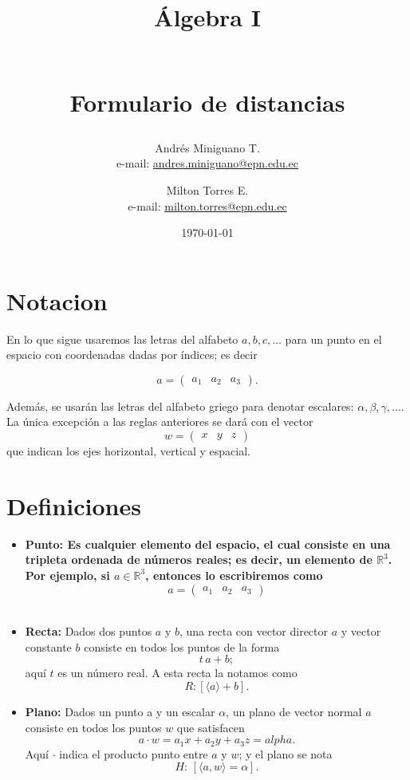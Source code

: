 \documentclass[11pt, a4paper]{article} %
\title{\begin{large}Álgebra  I\end{large}\\ Formulario de distancias}
\author{Andrés Miniguano T. \\ e-mail: \href{mailto:andres.miniguano@epn.edu.ec}{andres.miniguano@epn.edu.ec} 
   \and Milton Torres E. \\ e-mail: \href{mailto:milton.torres@epn.edu.ec}{milton.torres@epn.edu.ec} }
\date{\today}
\newcommand{\R}{\mathbb{R}}
\begin{document}
\maketitle


\section*{Notacion}En lo que sigue usaremos las letras del alfabeto \(a,b,c,\ldots\) para un punto en el espacio con coordenadas dadas por índices; es decir

\[ 
a=  \begin{pmatrix}  a_1 & a_2 & a_3 \end{pmatrix}.
\]

Además, se usarán las letras del alfabeto griego para denotar escalares: \(\alpha, \beta, \gamma, \ldots\). 
\noindent La única excepción a las reglas anteriores se dará con el vector
\[ 
	w=  \begin{pmatrix}  x & y & z\end{pmatrix}
\]
que indican los ejes horizontal, vertical y espacial.

\section*{Definiciones}
\begin{itemize}
\item\bf{Punto:} Es cualquier elemento del espacio, el cual consiste en una tripleta ordenada de números reales; es decir, un elemento de \( \R^3\). Por ejemplo, si \( a\in \R^3\), entonces lo escribiremos como\[a =\left( \begin{matrix}a_1 & a_2 & a_3\end{matrix}\right)\] \\ \item\textbf{Recta:} Dados dos puntos \(a\) y \(b\), una recta con vector director \(a\) y vector constante \(b\) consiste en todos los puntos de la forma\begin{equation*}t \,a + b;\end{equation*}aquí \(t\) es un número real. A esta recta la notamos como\[R: [\langle a\rangle + b].\]
\item\textbf{Plano:} Dados un punto a y un escalar \(\alpha\), un plano de vector normal \(a\) consiste en todos los puntos \(w\) que satisfacen$$a \cdot  w = a_1 x + a_2 y + a_3 z = alpha.$$Aquí \( \cdot\) indica el producto punto entre \(a\) y \(w\); y el plano se nota
\[
H: \, [ \langle a,w \rangle = \alpha ].
\]
\end{itemize}
\end{document}

